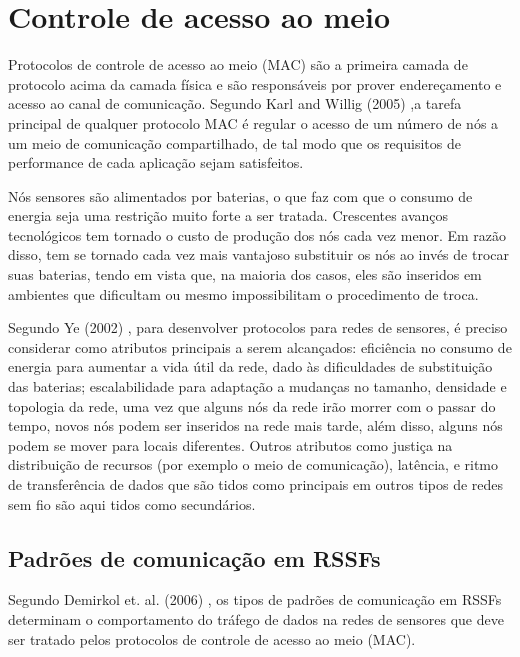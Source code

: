 \section{Controle de acesso ao meio}
\label{sec:macProtocols}

Protocolos de controle de acesso ao meio (MAC) são a primeira camada de protocolo acima da camada física e são responsáveis por prover endereçamento e acesso ao canal de comunicação. Segundo Karl and Willig (2005) \cite{Karl2005},a tarefa principal de qualquer protocolo MAC é regular o acesso de um número de nós a um meio de comunicação compartilhado, de tal modo que os requisitos de performance de cada aplicação sejam satisfeitos.

Nós sensores são alimentados por baterias, o que faz com que o consumo de energia seja uma restrição muito forte a ser tratada. Crescentes avanços tecnológicos tem tornado o custo de produção dos nós cada vez menor. Em razão disso, tem se tornado cada vez mais vantajoso substituir os nós ao invés de trocar suas baterias, tendo em vista que, na maioria dos casos, eles são inseridos em ambientes que dificultam ou mesmo impossibilitam o procedimento de troca. 

Segundo Ye (2002) \cite{Ye2002}, para desenvolver protocolos para redes de sensores, é preciso considerar como atributos principais a serem alcançados: eficiência no consumo de energia para aumentar a vida útil da rede, dado às dificuldades de substituição das baterias; escalabilidade para adaptação a mudanças no tamanho, densidade e topologia da rede, uma vez que alguns nós da rede irão morrer com o passar do tempo, novos nós podem ser inseridos na rede mais tarde, além disso, alguns nós podem se mover para locais diferentes. Outros atributos como justiça na distribuição de recursos (por exemplo o meio de comunicação), latência, e ritmo de transferência de dados que são tidos como principais em outros tipos de redes sem fio são aqui tidos como secundários.

\subsection{Padrões de comunicação em RSSFs}
\label{sec:comnPatt}
 
Segundo Demirkol et. al. (2006) \cite{Demirkol2006}, os tipos de padrões de comunicação em RSSFs determinam o comportamento do tráfego de dados na redes de sensores que deve ser tratado pelos protocolos de controle de acesso ao meio (MAC). 

